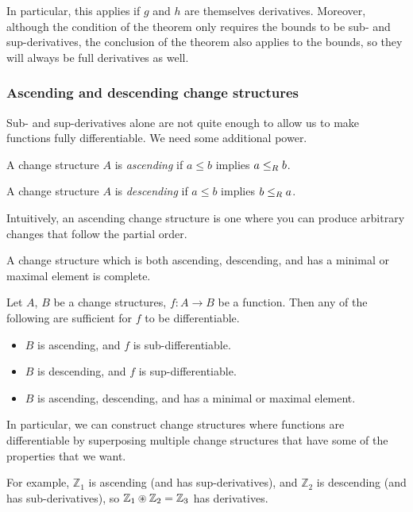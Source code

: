 In particular, this applies if $g$ and $h$ are themselves derivatives. Moreover,
although the condition of the theorem only requires the bounds to be sub- and
sup-derivatives, the conclusion of the theorem also applies to the bounds, so
they will always be full derivatives as well.

\subsubsection{Ascending and descending change structures}

Sub- and sup-derivatives alone are not quite enough to allow us to make
functions fully differentiable. We need some additional power.

\begin{defn}
  A change structure $A$ is \textit{ascending} if $a \leq b$ implies $a
  \leq_R b$.

  A change structure $A$ is \textit{descending} if $a \leq b$ implies $b
  \leq_R a$.
\end{defn}

Intuitively, an ascending change structure is one where you can produce
arbitrary changes that follow the partial order.

\begin{corollary}
  A change structure which is both ascending, descending, and has a minimal or
  maximal element is complete.
\end{corollary}

\begin{thm}
  Let $A$, $B$ be a change structures, $f: A \rightarrow B$ be a function. Then
  any of the following are sufficient for $f$ to be differentiable.
  \begin{itemize}
    \item $B$ is ascending, and $f$ is sub-differentiable.
    \item $B$ is descending, and $f$ is sup-differentiable.
    \item $B$ is ascending, descending, and has a minimal or maximal element.
  \end{itemize}
\end{thm}

In particular, we can construct change structures where functions are
differentiable by superposing multiple change structures that have some of the
properties that we want.

For example, $\mathbb{Z}_1$ is ascending (and has sup-derivatives), and
$\mathbb{Z}_2$ is descending (and has sub-derivatives), so $\mathbb{Z}_1
\circledast \mathbb{Z}_2 = \mathbb{Z}_3$ has derivatives.

